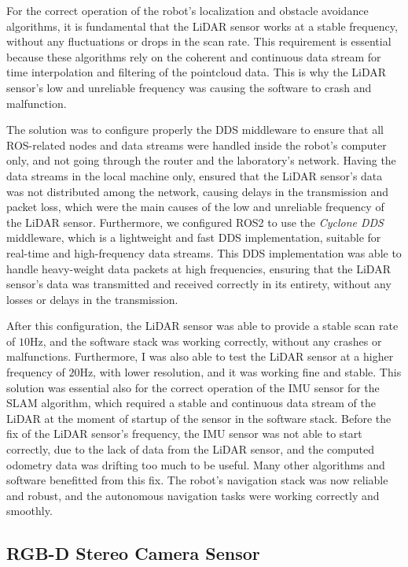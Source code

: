 For the correct operation of the robot's localization and obstacle 
avoidance algorithms, it is fundamental that the LiDAR sensor works at a stable frequency, 
without any fluctuations or drops in the scan rate. This requirement is essential because these algorithms rely on the
coherent and continuous data stream for time interpolation and filtering of the pointcloud data.
This is why the LiDAR sensor's low and unreliable frequency was causing the software to crash and malfunction.

The solution was to configure properly the DDS middleware to ensure that all ROS-related nodes and data streams
were handled inside the robot's computer only, and not going through the router and the laboratory's network.
Having the data streams in the local machine only, ensured that the LiDAR sensor's data was not distributed 
among the network, causing delays in the transmission and packet loss, which were the main causes of the low and unreliable
frequency of the LiDAR sensor. Furthermore, we configured ROS2 to use the \textit{Cyclone DDS} middleware, which is a lightweight
and fast DDS implementation, suitable for real-time and high-frequency data streams. This DDS implementation was able to handle
heavy-weight data packets at high frequencies, ensuring that the LiDAR sensor's data was transmitted and received correctly
in its entirety, without any losses or delays in the transmission.

After this configuration, the LiDAR sensor was able to provide a stable scan rate of $10$Hz,
and the software stack was working correctly, without any crashes or malfunctions.
Furthermore, I was also able to test the LiDAR sensor at a higher frequency of $20$Hz, 
with lower resolution, and it was working fine and stable.
This solution was essential also for the correct operation of the IMU sensor for the SLAM algorithm, which required
a stable and continuous data stream of the LiDAR at the moment of startup of the sensor in the software stack. Before the 
fix of the LiDAR sensor's frequency, the IMU sensor was not able to start correctly, due to the lack of data
from the LiDAR sensor, and the computed odometry data was drifting too much to be useful.
Many other algorithms and software benefitted from this fix. The robot's navigation stack was now reliable and robust,
and the autonomous navigation tasks were working correctly and smoothly.

\subsection{RGB-D Stereo Camera Sensor}

